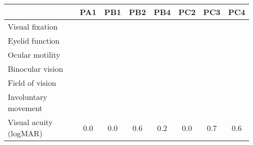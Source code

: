
\small
\sffamily
\let\oldarraystretch\arraystretch
\renewcommand{\arraystretch}{2}
\newcommand{\skill}{\cellcolor{lightgray}}
\newcommand{\noskill}{\cellcolor{accent1}\textcolor{muteblack}{\BigCross}}
\newcommand{\snoskill}{\cellcolor{accent2}\textcolor{muteblack}{\BigDiamondshape}}

\begin{tabular}{|l|ccccccc|}
  \hline
                          & PA1      & PB1      & PB2       & PB4      & PC2       & PC3       & PC4 \\ \hline
  Visual fixation         & \noskill & \noskill & \noskill  & \noskill & \noskill  & \noskill  & \noskill \\
  Eyelid function         & \skill   & \skill   & \skill    & \skill   &  \skill  & \noskill  & \noskill \\
  Ocular motility         & \skill   & \noskill & \skill    & \noskill & \snoskill & \snoskill & \noskill\\
  Binocular vision        & \skill   & \skill   & \skill    & \skill   & \noskill  & \snoskill & \snoskill \\
  Field of vision         & \skill   & \skill   & \skill    & \skill   & \skill    & \noskill  & \noskill \\
  Involuntary movement    & \skill   & \noskill & \snoskill  & \noskill &  \noskill  & \noskill  & \skill \\ \hline
  Visual acuity (logMAR)  & 0.0      & 0.0      & 0.6       & 0.2      & 0.0       & 0.7  & 0.6\\
  \hline
\end{tabular}
